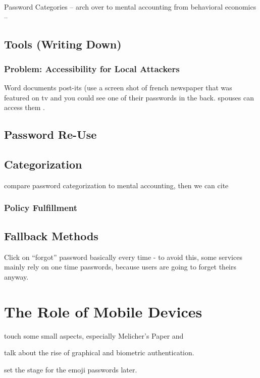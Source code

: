 	Password Categories -- arch over to mental accounting from behavioral economics -- \cite{Thaler2004}
	
	\cite{Stobert2015ExpertPassword}
	
	
	\subsection{Tools (Writing Down)}
		\subsubsection{Problem: Accessibility for Local Attackers}
Word documents post-its (use a screen shot of french newspaper that was featured on tv and you could see one of their passwords in the back. spouses can access them .

	\subsection{Password Re-Use}
	
	
	
		\subsection{Categorization}
		compare password categorization to mental accounting, then we can cite \cite{Stockinger2015TowardsBE}
		\subsubsection{Policy Fulfillment}

	\subsection{Fallback Methods}
	Click on ``forgot'' password basically every time - to avoid this, some services mainly rely on one time passwords, because users are going to forget theirs anyway. 

\section{The Role of Mobile Devices}
touch some small aspects, especially Melicher's Paper \cite{Melicher2016UsabilityMobileTextPasswords} and \cite{VonZezschwitz2014HoneyIShrunkTheKeys}
\cite{Haque2014PsychometricsStrongPassword} 

talk about the rise of graphical and biometric authentication. 


set the stage for the emoji passwords later. 


